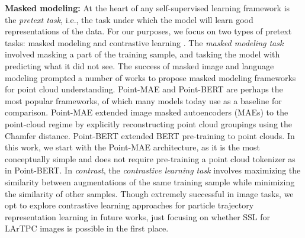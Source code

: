 \textbf{Masked modeling:} At the heart of any self-supervised learning framework is the \textit{pretext task}, i.e., the task under which the model will learn good representations of the data. For our purposes, we focus on two types of pretext tasks: masked modeling \cite{devlin2018bert} and contrastive learning \cite{chen2020simple,he2020momentum,oord2018representation,tian2020contrastive,tian2020makes}. The \textit{masked modeling task} involved masking a part of the training sample, and tasking the model with predicting what it did not see. The success of masked image \cite{he2021maskedautoencodersscalablevision} and language \cite{devlin2018bert} modeling prompted a number of works to propose masked modeling frameworks for point cloud understanding. Point-MAE \cite{pang2022maskedautoencoderspointcloud} and Point-BERT \cite{yu2022pointbertpretraining3dpoint} are perhaps the most popular frameworks, of which many models today use as a baseline for comparison. Point-MAE extended image masked autoencoders (MAEs) \cite{he2021maskedautoencodersscalablevision} to the point-cloud regime by explicitly reconstructing point cloud groupings using the Chamfer distance. Point-BERT extended BERT \cite{devlin2018bert} pre-training to point clouds. In this work, we start with the Point-MAE architecture, as it is the most conceptually simple and does not require pre-training a point cloud tokenizer as in Point-BERT. In \textit{contrast}, the \textit{contrastive learning task} involves maximizing the similarity between augmentations of the same training sample while minimizing the similarity of other samples. 
Though extremely successful in image tasks, we opt to explore contrastive learning approaches for particle trajectory representation learning in future works, just focusing on whether SSL for LArTPC images is possible in the first place.

